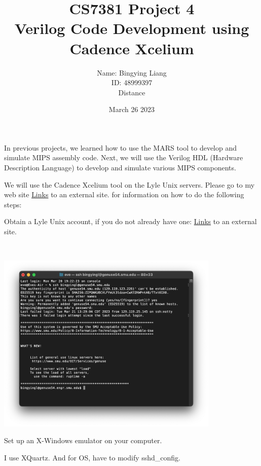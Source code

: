 \documentclass[12pt]{article}
\title{CS7381 Project 4 \\ 
Verilog Code Development using Cadence Xcelium }
\author{
Name: Bingying Liang \\
ID: 48999397\\  
Distance}
\date{March 26 2023}
\newenvironment{sol}[1][Solution]{\begin{trivlist}\item[\hskip\labelsep {\bfseries #1:}]}{\end{trivlist}}
\begin{document}
\maketitle

In previous projects, we learned how to use the MARS tool to develop and simulate MIPS assembly code.  Next, we will use the Verilog HDL (Hardware Description Language) to develop and simulate various MIPS components. 

We will use the Cadence Xcelium tool on the Lyle Unix servers.  Please go to my web site \href{http://lyle.smu.edu/~manikas/CAD_tool_info.html}{Links} to an external site. for information on how to do the following steps:
\begin{enumerate}
    \item Obtain a Lyle Unix account, if you do not already have one: \href{https://www.smu.edu/OIT/Services/genuse} {Links} to an external site.
    \begin{sol}
        \hspace*{\fill} \\
        \begin{center}
        \includegraphics[width=0.8\textwidth]{1.png} 
    \end{center}
    \end{sol}
    \item Set up an X-Windows emulator on your computer.
    \begin{sol}
        I use XQuartz. And for OS, have to modify sshd\_config.
        \begin{center}

\end{center}
\end{sol}
\end{enumerate}
\end{document}
